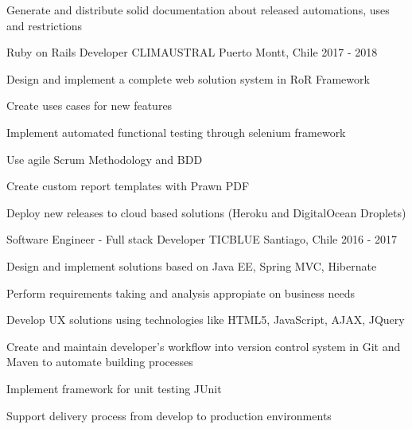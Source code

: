 \begin{cventries}
{\begin{cvitems}
      \item {Generate and distribute solid documentation about released automations, uses and restrictions}
    \end{cvitems}
  }
  \cventry
    {Ruby on Rails Developer} %
    {CLIMAUSTRAL} %
    {Puerto Montt, Chile} %
    {2017 - 2018} %
    {
      \begin{cvitems} %
        \item {Design and implement a complete web solution system in RoR Framework}
        \item {Create uses cases for new features}
        \item {Implement automated functional testing through selenium framework}
        \item {Use agile Scrum Methodology and BDD}
        \item {Create custom report templates with Prawn PDF}
        \item {Deploy new releases to cloud based solutions (Heroku and DigitalOcean Droplets)}
      \end{cvitems}
    }
  \cventry
    {Software Engineer - Full stack Developer} %
    {TICBLUE} %
    {Santiago, Chile} %
    {2016 - 2017} %
    {
      \begin{cvitems} %
        \item {Design and implement solutions based on Java EE, Spring MVC, Hibernate}
        \item {Perform requirements taking and analysis appropiate on business needs}
        \item {Develop UX solutions using technologies like HTML5, JavaScript, AJAX, JQuery}
        \item {Create and maintain developer's workflow into version control system in Git and Maven to automate building processes}
        \item {Implement framework for unit testing JUnit}
        \item {Support delivery process from develop to production environments}
      \end{cvitems}
    }

\end{cventries}
